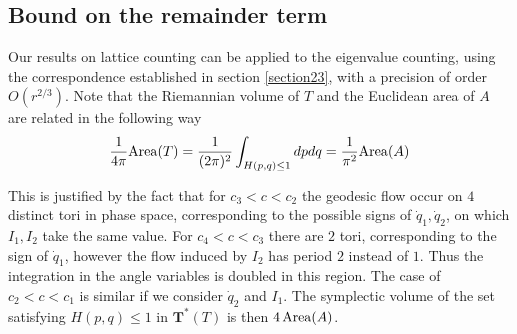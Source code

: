 \documentclass[12pt]{amsart}
\numberwithin{equation}{subsection}
\theoremstyle{definition}
\theoremstyle{plain}
\begin{document}
\subsection{Bound on the remainder term}
\label{boundremterm}
Our results on lattice counting can be applied to the
eigenvalue counting, using the correspondence established in section \ref{section23}, with a
precision of order $O(r^{2/3})$.
Note that the Riemannian volume of $T$ and the Euclidean area of $A$ are related in the following way
\[
\frac{1}{4 \pi} {{\rm {Area}}}(T) = \frac{1}{(2\pi)^2} \int_{H(p,q)\leq 1} dp dq = \frac{1}{\pi^2} {{\rm {Area}}}(A)
\]

This is justified by the fact that for $c_3 < c < c_2$ the geodesic flow occur on $4$ distinct tori in phase space,
corresponding to the possible signs of $\dot{q}_1,\dot{q}_2$, on which $I_1,I_2$ take the same value.
For $c_4 < c < c_3$ there are $2$ tori, corresponding to the sign of $\dot{q}_1$, however the flow induced
by $I_2$ has period $2$ instead of $1$. Thus the integration in the angle variables is doubled in this region.
The case of $c_2 < c < c_1$ is similar if we consider $\dot{q}_2$ and $I_1$.
The symplectic volume of the set satisfying $H(p,q) \leq 1$ in $\textbf{T}^{*}(T)$ is then $4\, {{\rm {Area}}}(A)$.
\end{document}
